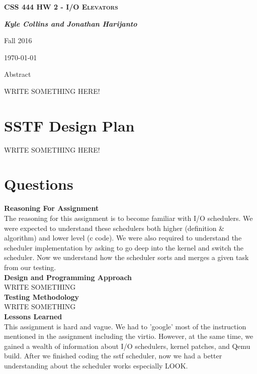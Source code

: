 \documentclass[letterpaper,10pt,draftclsnofoot,titlepage,onecolumn]{IEEEtran}
\begin{document}
	
	\begin{titlepage}
		\centering
		{\scshape\LARGE \textbf{CSS 444 HW 2 - I/O Elevators}\par}
		{\LARGE\itshape \textbf{Kyle Collins and Jonathan Harijanto}\par}
		{\LARGE Fall 2016\par}
		{\LARGE \today\par}
		
		{\LARGE Abstract\par}
		WRITE SOMETHING HERE!
		
	\end{titlepage}
	
	\clearpage
	\tableofcontents
	
	\clearpage
	\section{SSTF Design Plan}
	
	WRITE SOMETHING HERE!

	\clearpage
	\section{Questions}
	
	\textbf{Reasoning For Assignment}\\
	The reasoning for this assignment is to become familiar with I/O schedulers. We were expected to understand these schedulers both higher (definition \& algorithm) and lower level (c code). We were also required to understand the scheduler implementation by asking to go deep into the kernel and switch the scheduler. Now we understand how the scheduler sorts and merges a given task from our testing.	\\
		
	\textbf{Design and Programming Approach}\\
		WRITE SOMETHING
	\\

	\textbf{Testing Methodology}\\
		WRITE SOMETHING
	\\ 

	\textbf{Lessons Learned}\\
	This assignment is hard and vague. We had to 'google' most of the instruction mentioned in the assignment including the virtio. However, at the same time, we gained a wealth of information about I/O schedulers, kernel patches, and Qemu build. After we finished coding the sstf scheduler, now we had a better understanding about the scheduler works especially LOOK. \\
\end{document}
